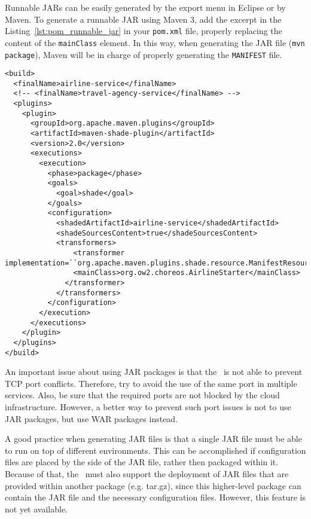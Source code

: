 Runnable JARs can be easily generated by the export menu in Eclipse or by Maven. To generate a runnable JAR using Maven 3, add the excerpt in the Listing~\ref{lst:pom_runnable_jar} in your \texttt{pom.xml} file, properly replacing the content of the \texttt{mainClass} element. In this way, when generating the JAR file (\texttt{mvn package}), Maven will be in charge of properly generating the \texttt{MANIFEST} file.

\lstset{
language=XML
}

{\footnotesize
\begin{lstlisting}[caption=Excerpt of pom file to generate a runnable JAR using Maven 3, label=lst:pom_runnable_jar]
<build>
  <finalName>airline-service</finalName> 
  <!-- <finalName>travel-agency-service</finalName> -->
  <plugins>
    <plugin>
      <groupId>org.apache.maven.plugins</groupId>
      <artifactId>maven-shade-plugin</artifactId>
      <version>2.0</version>
      <executions>
        <execution>
          <phase>package</phase>
          <goals>
            <goal>shade</goal>
          </goals>
          <configuration>
            <shadedArtifactId>airline-service</shadedArtifactId>
            <shadeSourcesContent>true</shadeSourcesContent>
            <transformers>
                <transformer 
implementation=``org.apache.maven.plugins.shade.resource.ManifestResourceTransformer''>
                <mainClass>org.ow2.choreos.AirlineStarter</mainClass>
              </transformer>
            </transformers>
          </configuration>
        </execution>
      </executions>
    </plugin>
  </plugins>
</build>
\end{lstlisting}
}

An important issue about using JAR packages is that the \ee\ is not able to prevent TCP port conflicts. Therefore, try to avoid the use of the same port in multiple services. Also, be sure that the required ports are not blocked by the cloud infrastructure. However, a better way to prevent such port issues is not to use JAR packages, but use WAR packages instead.

A good practice when generating JAR files is that a single JAR file must be able to run on top of different environments. This can be accomplished if configuration files are placed by the side of the JAR file, rather then packaged within it. Because of that, the \ee\ must also support the deployment of JAR files that are provided within another package (e.g. tar.gz), since this higher-level package can contain the JAR file and the necessary configuration files. However, this feature is not yet available.

